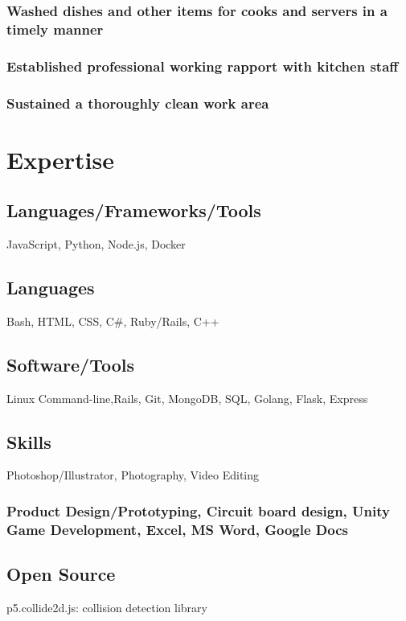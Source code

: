 \documentclass{article}
\begin{document}
		\subsubsection{Washed dishes and other items for cooks and servers in a timely manner}
		\subsubsection{Established professional working rapport with kitchen staff}
		\subsubsection{Sustained a thoroughly clean work area}
\section{Expertise}
		\subsection{Languages/Frameworks/Tools}
		JavaScript, Python, Node.js, Docker
		\subsection{Languages}
		Bash, HTML, CSS,  C\#, Ruby/Rails, C++
		\vspace{-2mm}
		
		\subsection{Software/Tools}
		Linux Command-line,Rails, Git, MongoDB, SQL, Golang, Flask, Express
		\vspace{-3mm}
		\subsection{Skills}Photoshop/Illustrator, Photography, Video Editing
		\vspace{-3mm}
		\subsubsection{Product Design/Prototyping, Circuit board design,  Unity Game Development, Excel, MS Word, Google Docs}
		\vspace{-3mm}

    	\subsection{Open Source} p5.collide2d.js: collision detection library
\end{document}
